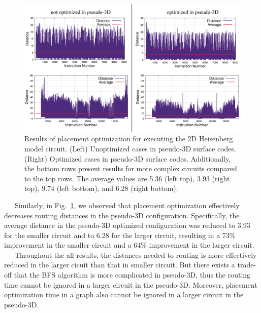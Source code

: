 \documentclass[a4paper,11pt]{ltjsarticle}
\begin{document}
{    \begin{figure}[h]
        \centering
        \includegraphics[scale=0.5]{figure/placement_optimization_3D.eps}
        \vspace{-20pt}\caption{Results of placement optimization for executing the 2D Heisenberg model circuit. (Left) Unoptimized cases in pseudo-3D surface codes. (Right) Optimized cases in pseudo-3D surface codes. Additionally, the bottom rows present results for more complex circuits compared to the top rows. The average values are 5.36 (left top), 3.93 (right top), 9.74 (left bottom), and 6.28 (right bottom).}
        \label{placement_optimization_3D}
    \end{figure}

    \ \ \ Similarly, in Fig.~\ref{placement_optimization_3D}, we observed that placement optimization effectively decreases routing distances in the pseudo-3D configuration. Specifically, the average distance in the pseudo-3D optimized configuration was reduced to 3.93 for the smaller circuit and to 6.28 for the larger circuit, resulting in a 73\% improvement in the smaller circuit and a 64\% improvement in the larger circuit.\\
    \ \ \ Throughout the all results, the distances needed to routing is more effectively reduced in the larger cicuit than that in smaller circuit. But there exists a trade-off that the BFS algorithm is more complicated in pseudo-3D, thus the routing time cannot be ignored in a larger circuit in the pseudo-3D. Moreover, placement optimization time in a graph also cannot be ignored in a larger circuit in the pseudo-3D.
    \clearpage

}
\end{document}
